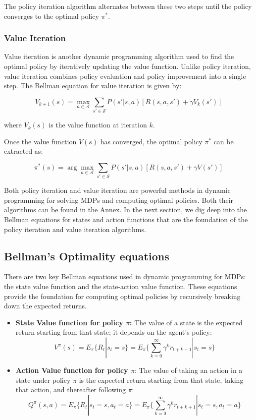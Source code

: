 The policy iteration algorithm alternates between these two steps until the policy converges to the optimal policy \(\pi^*\).

\subsubsection{Value Iteration}

Value iteration is another dynamic programming algorithm used to find the optimal policy by iteratively updating the value function. Unlike policy iteration, value iteration combines policy evaluation and policy improvement into a single step. The Bellman equation for value iteration is given by:

\[
V_{k+1}(s) = \max_{a \in \mathcal{A}} \sum_{s' \in \mathcal{S}} P(s'|s, a) \left[ R(s, a, s') + \gamma V_k(s') \right]
\]

where \(V_k(s)\) is the value function at iteration \(k\).

Once the value function \(V(s)\) has converged, the optimal policy \(\pi^*\) can be extracted as:

\[
\pi^*(s) = \arg\max_{a \in \mathcal{A}} \sum_{s' \in \mathcal{S}} P(s'|s, a) \left[ R(s, a, s') + \gamma V(s') \right]
\]

Both policy iteration and value iteration are powerful methods in dynamic programming for solving MDPs and computing optimal policies. Both their algorithms can be found in the Annex. In the next section, we dig deep into the Bellman equations for states and action functions that are the foundation of the policy iteration and value iteration algorithms.




\subsection{Bellman's Optimality equations}
There are two key Bellman equations used in dynamic programming for MDPs: the state value function and the state-action value function. These equations provide the foundation for computing optimal policies by recursively breaking down the expected returns.


\begin{itemize}
    \item \textbf{State Value function for policy $\pi$:} The value of a state is the expected return starting from that state; it depends on the agent’s policy: 
    \begin{equation}
    V^{\pi} (s) = E_{\pi} \{ R_t | s_t = s \} = E_{\pi} \{ \sum _{k=0} ^{\infty} \gamma ^{k} r_{t+k+1} | s_t=s \}
    \end{equation}
    \item \textbf{Action Value function for policy $\pi$}: The value of taking an action in a state under policy $\pi$ is the expected return starting from that state, taking that action, and thereafter following $\pi$:
    \begin{equation}
        Q^{\pi} (s,a) = E_{\pi} \{ R_t | s_t = s, a_t =a \} = E_{\pi} \{ \sum _{k=0} ^{\infty} \gamma ^{k} r_{t+k+1} | s_t=s, a_t =a \}
    \end{equation}
\end{itemize}

